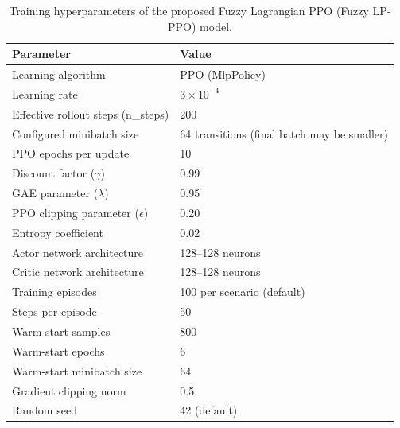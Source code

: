 \begin{table}[!t]
\caption{Training hyperparameters of the proposed Fuzzy Lagrangian PPO (Fuzzy LP-PPO) model.}
\label{tab:fuzzy_lp_ppo_hyperparameters}
\centering
\small
\begin{tabular}{@{}ll@{}}
\toprule
Parameter & Value \\
\midrule
Learning algorithm & PPO (MlpPolicy) \\
Learning rate & $3 \times 10^{-4}$ \\
Effective rollout steps (n\_steps) & 200 \\
Configured minibatch size & 64 transitions (final batch may be smaller) \\
PPO epochs per update & 10 \\
Discount factor ($\gamma$) & 0.99 \\
GAE parameter ($\lambda$) & 0.95 \\
PPO clipping parameter ($\epsilon$) & 0.20 \\
Entropy coefficient & 0.02 \\
Actor network architecture & 128--128 neurons \\
Critic network architecture & 128--128 neurons \\
Training episodes & 100 per scenario (default) \\
Steps per episode & 50 \\
Warm-start samples & 800 \\
Warm-start epochs & 6 \\
Warm-start minibatch size & 64 \\
Gradient clipping norm & 0.5 \\
Random seed & 42 (default) \\
\bottomrule
\end{tabular}
\end{table}
